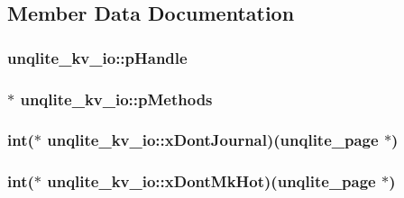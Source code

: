\subsection{Member Data Documentation}
\hypertarget{structunqlite__kv__io_a70e85cd52db1f24484d50c78f947f423}{
\subsubsection[{p\-Handle}]{ unqlite\-\_\-kv\-\_\-io\-::p\-Handle}}\label{dd/dc2/structunqlite__kv__io_a70e85cd52db1f24484d50c78f947f423}
\hypertarget{structunqlite__kv__io_a62f6d1c246e5b6f45d27242eb6d9e95b}{
\subsubsection[{p\-Methods}]{ $\ast$ unqlite\-\_\-kv\-\_\-io\-::p\-Methods}}\label{dd/dc2/structunqlite__kv__io_a62f6d1c246e5b6f45d27242eb6d9e95b}
\hypertarget{structunqlite__kv__io_ae36240879b4363f2a03c769801f20dff}{
\subsubsection[{x\-Dont\-Journal}]{\setlength{\rightskip}{0pt plus 5cm}int($\ast$ unqlite\-\_\-kv\-\_\-io\-::x\-Dont\-Journal)({\bf unqlite\-\_\-page} $\ast$)}}\label{dd/dc2/structunqlite__kv__io_ae36240879b4363f2a03c769801f20dff}
\hypertarget{structunqlite__kv__io_a89ae893a89b76f7bf690b56417719f04}{
\subsubsection[{x\-Dont\-Mk\-Hot}]{\setlength{\rightskip}{0pt plus 5cm}int($\ast$ unqlite\-\_\-kv\-\_\-io\-::x\-Dont\-Mk\-Hot)({\bf unqlite\-\_\-page} $\ast$)}}\label{dd/dc2/structunqlite__kv__io_a89ae893a89b76f7bf690b56417719f04}
